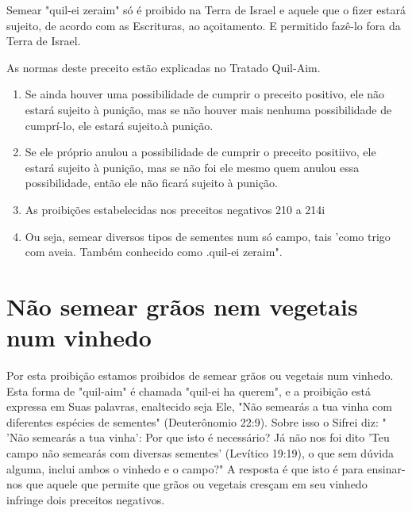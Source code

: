 \begin{itemize}
\begin{enumrate}
\begin{itemize}
\begin{itemize}
\begin{itemize}
Semear "quil-ei zeraim" só é proibido na Terra de Israel e aquele que o
fizer estará sujeito, de acordo com as Escrituras, ao açoitamento. E
per­mitido fazê-lo fora da Terra de Israel.


As normas deste preceito estão explicadas no Tratado Quil-Aim.

\begin{enumerate}
\def\labelenumi{\arabic{enumi}.}
\setcounter{enumi}{384}
\item
 
 Se ainda houver uma possibilidade de cumprir o preceito positivo, ele
 não estará sujeito à punição, mas se não houver mais nenhuma
 possibilidade de cumprí-lo, ele estará sujeito.à punição.
 
\item
 
 Se ele próprio anulou a possibilidade de cumprir o preceito positiivo,
 ele estará sujeito à puni­ção, mas se não foi ele mesmo quem anulou
 essa possibilidade, então ele não ficará sujeito à punição.
 
\item
 
 As proibições estabelecidas nos preceitos negativos 210 a 214i
 
\item
 
 Ou seja, semear diversos tipos de sementes num só campo, tais 'como
 trigo com aveia. Tam­bém conhecido como .quil-ei
 zeraim".
 
\end{enumerate}



\section{Não semear grãos nem vegetais num vinhedo}

Por esta proibição estamos proibidos de semear grãos ou vegetais num
vinhedo. Esta forma de "quil-aim" é chamada "quil-ei ha querem", e a
proibição está expressa em Suas palavras, enaltecido seja Ele, "Não
semearás a tua vinha com diferentes espécies de sementes" (Deuterônomio
22:9). Sobre isso o Sifrei diz: " 'Não semearás a tua vinha': Por que
isto é necessário? Já não nos foi dito 'Teu campo não semearás com
diversas sementes' (Levítico 19:19), o que sem dúvida alguma, inclui
ambos o vinhedo e o campo?" A resposta é que isto é para ensinar-nos que
aquele que permite que grãos ou vegetais cres­çam em seu vinhedo
infringe dois preceitos negativos.


\end{itemize}
\end{itemize}
\end{itemize}
\end{enumrate}
\end{itemize}
